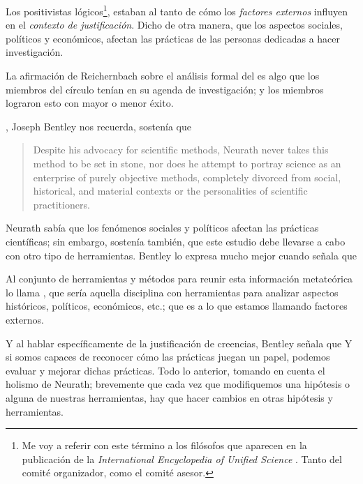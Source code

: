 Los positivistas lógicos\footnote{
	Me voy a referir con este término a los filósofos que aparecen en la publicación de la \emph{International Encyclopedia of Unified Science} \parencite{Carnap1938-CARFOL-10}. Tanto del comité organizador, como el comité asesor.
	}, 
estaban al tanto de cómo los \emph{factores externos} influyen en el \emph{contexto de justificación}.
Dicho de otra manera, que los aspectos sociales, políticos y económicos, afectan las prácticas de las personas dedicadas a hacer investigación.

La afirmación de Reichernbach sobre el análisis formal del  es algo que los miembros del círculo tenían en su agenda de investigación; y los miembros lograron esto con mayor o menor éxito.

, Joseph Bentley nos recuerda, sostenía que

\begin{quote}
	Despite his advocacy for scientific methods, Neurath never takes this method to be set in stone, nor does he attempt to portray science as an enterprise of purely objective methods, completely divorced from social, historical, and material contexts or the personalities of scientific practitioners. \parencite[p.41][]{Bentley2023}
\end{quote}

Neurath sabía que los fenómenos sociales y políticos afectan las prácticas científicas; sin embargo, sostenía también, que este estudio debe llevarse a cabo con otro tipo de herramientas.
Bentley lo expresa mucho mejor cuando señala que  \parencite[p. 62]{Bentley2023}

Al conjunto de herramientas y métodos para reunir esta información metateórica lo llama , que sería aquella disciplina con herramientas para analizar aspectos históricos, políticos, económicos, etc.; que es a lo que estamos llamando factores externos. 

Y al hablar específicamente de la justificación de creencias, Bentley señala que  \parencite[p. 41][]{Bentley2023}
Y si somos capaces de reconocer cómo las prácticas juegan un papel, podemos evaluar y mejorar dichas prácticas.
Todo lo anterior, tomando en cuenta el holismo de Neurath; brevemente que cada vez que modifiquemos una hipótesis o alguna de nuestras herramientas, hay que hacer cambios en otras hipótesis y herramientas.


